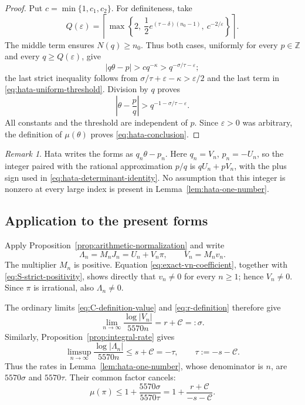 \documentclass[11pt,reqno,letterpaper]{amsart}
\numberwithin{equation}{section}
\theoremstyle{definition}
\theoremstyle{remark}
\newtheorem{remark}[theorem]{Remark}
\begin{document}
\begin{proof}
Put \(c=\min\{1,c_1,c_2\}\).  For definiteness, take
\begin{equation}\label{eq:hata-uniform-threshold}
 Q(\varepsilon)=\left\lceil\max\left\{
 2,\ \frac12e^{(\tau-\delta)(n_0-1)},\ c^{-2/\varepsilon}
 \right\}\right\rceil.
\end{equation}
The middle term ensures \(N(q)\geq n_0\).  Thus both cases, uniformly
for every \(p\in\mathbb Z\) and every \(q\geq Q(\varepsilon)\), give
\[
 |q\theta-p|>cq^{-\kappa}
 >q^{-\sigma/\tau-\varepsilon};
\]
the last strict inequality follows from
\(\sigma/\tau+\varepsilon-\kappa>\varepsilon/2\) and the last term in
\eqref{eq:hata-uniform-threshold}.  Division by \(q\) proves
\[
 \left|\theta-\frac pq\right|
 >q^{-1-\sigma/\tau-\varepsilon}.
\]
All constants and the threshold are independent of \(p\).  Since
\(\varepsilon>0\) was arbitrary, the definition of \(\mu(\theta)\)
proves \eqref{eq:hata-conclusion}.
\end{proof}

\begin{remark}\label{rem:hata-signs}
Hata writes the forms as \(q_n\theta-p_n\).  Here
\(q_n=V_n\), \(p_n=-U_n\), so the integer paired with the rational
approximation \(p/q\) is \(qU_n+pV_n\), with the plus sign used in
\eqref{eq:hata-determinant-identity}.  No assumption that this integer
is nonzero at every large index is present in Lemma~\ref{lem:hata-one-number}.
\end{remark}

\subsection{Application to the present forms}

Apply Proposition~\ref{prop:arithmetic-normalization} and write
\begin{equation}\label{eq:normalized-integer-form}
 \Lambda_n=M_nJ_n=U_n+V_n\pi,
 \qquad V_n=M_nv_n.
\end{equation}
The multiplier \(M_n\) is positive.  Equation
\eqref{eq:exact-vn-coefficient}, together with
\eqref{eq:S-strict-positivity}, shows directly that \(v_n\ne0\) for
every \(n\geq1\); hence \(V_n\ne0\).  Since \(\pi\) is irrational,
also \(\Lambda_n\ne0\).

The ordinary limits \eqref{eq:C-definition-value} and
\eqref{eq:r-definition} therefore give
\begin{equation}\label{eq:integer-coefficient-rate}
 \lim_{n\to\infty}\frac{\log|V_n|}{5570n}
 =r+\mathcal C=: \sigma.
\end{equation}
Similarly, Proposition~\ref{prop:integral-rate} gives
\begin{equation}\label{eq:integer-form-rate}
 \limsup_{n\to\infty}\frac{\log|\Lambda_n|}{5570n}
 \leq s+\mathcal C=-\tau,
 \qquad \tau:=-s-\mathcal C.
\end{equation}
Thus the rates in Lemma~\ref{lem:hata-one-number}, whose denominator is
\(n\), are \(5570\sigma\) and \(5570\tau\).  Their common factor cancels:
\begin{equation}\label{eq:pi-measure-formula}
 \mu(\pi)\leq1+\frac{5570\sigma}{5570\tau}
 =1+\frac{r+\mathcal C}{-s-\mathcal C}.
\end{equation}
\end{document}
